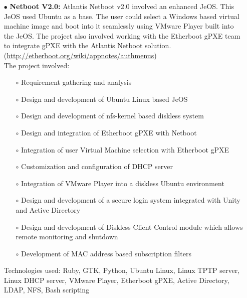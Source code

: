 \documentclass{scrartcl}
\begin{document}
\begin{cv}{
\href{http://www.develmj.com}{}
}
{\begin{itemize}
\begin{itemize}
  \item[\footnotesize$\circ$] Design and development of a secure login into the Netboot JeOS
    integrated to use Unity credentials
  \end{itemize}
  Technologies used: Python, GTK, Linux DHCP server, Knoppix Linux, Qemu,
  Bash scripting
\item[\footnotesize$\bullet$] \textbf{Netboot V2.0:} Atlantis Netboot v2.0 involved an enhanced JeOS. This JeOS
used Ubuntu as a base. The user could select a Windows based virtual
machine image and boot into it seamlessly using VMware Player built into the
JeOS. The project also involved working with the Etherboot gPXE team to
integrate gPXE with the Atlantis Netboot solution.
\\(\url{http://etherboot.org/wiki/appnotes/authmenus})\\
The project involved:
  \begin{itemize}
  \item[\footnotesize$\circ$] Requirement gathering and analysis
  \item[\footnotesize$\circ$] Design and development of Ubuntu Linux based JeOS
  \item[\footnotesize$\circ$] Design and development of nfs-kernel based diskless system
  \item[\footnotesize$\circ$] Design and integration of Etherboot gPXE with Netboot
  \item[\footnotesize$\circ$] Integration of user Virtual Machine selection with Etherboot gPXE
  \item[\footnotesize$\circ$] Customization and configuration of DHCP server
  \item[\footnotesize$\circ$] Integration of VMware Player into a diskless Ubuntu environment
  \item[\footnotesize$\circ$] Design and development of a secure login system integrated with Unity
    and Active Directory
  \item[\footnotesize$\circ$] Design and development of Diskless Client Control module which
    allows remote monitoring and shutdown
  \item[\footnotesize$\circ$] Development of MAC address based
    subscription filters
  \end{itemize}
  Technologies used: Ruby, GTK, Python, Ubuntu Linux, Linux TPTP server,
  Linux DHCP server, VMware Player, Etherboot gPXE, Active Directory, LDAP,
  NFS, Bash scripting
\end{itemize}
}


\end{cv}
\end{document}
